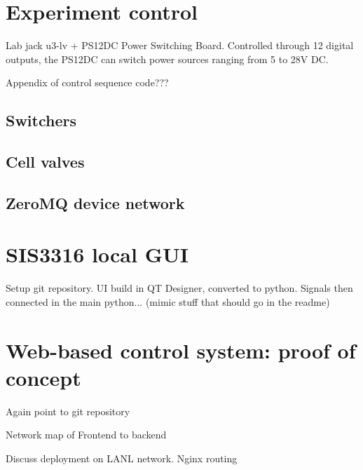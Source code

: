 

\section{Experiment control}


Lab jack u3-lv + PS12DC Power Switching Board. Controlled through 12 digital outputs, the PS12DC can switch power sources ranging from 5 to 28V DC. 

Appendix of control sequence code???


\subsection{Switchers}



\subsection{Cell valves}



\subsection{ZeroMQ device network}



\section{SIS3316 local GUI}


Setup git repository. UI build in QT Designer, converted to python. Signals then connected in the main python... (mimic stuff that should go in the readme)


\section{Web-based control system: proof of concept}


Again point to git repository

Network map of Frontend to backend

Discuss deployment on LANL network. Nginx routing